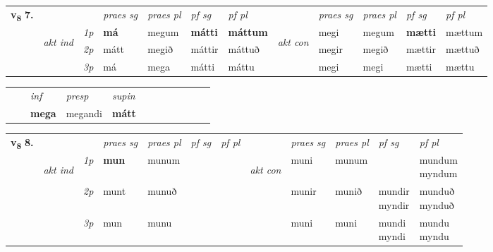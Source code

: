 \begin{tabular}{llllllllllll} \toprule
\multirow{4}{*}{{{\textbf{v{\textsubscript{8}}} \Large{\textbf{7.}}}}}  & &   &  \textit{praes sg}  & \textit{praes pl}  &\textit{ pf sg} & \textit{pf pl} &  &  \textit{praes sg}  & \textit{praes pl}  & \textit{pf sg} & \textit{pf pl } \\*
	\cmidrule{4-7} \cmidrule{9-12}
 & \multirow{3}{*}{\begin{turn}{90}\textit{akt ind}\end{turn}} & {\textit{1p}} & \textbf{má} & megum    & \textbf{mátti} & \textbf{máttum} & \multirow{3}{*}{\begin{turn}{90}\textit{akt con}\end{turn}} &megi & megum & \textbf{mætti} & mættum\\*
& &  {\textit{2p}} &  mátt  & megið   & máttir & máttuð & & megir & megið & mættir & mættuð \\*
& &  {\textit{3p}} & má & mega   & mátti & máttu & & megi & megi& mætti & mættu  \\*
\cmidrule{4-7} \cmidrule{9-12}
\end{tabular}


\begin{tabular}{llllllllllll}
 & & \textit{inf}     & \textit{presp} & \textit{supin}       \\*
  & & \textbf{mega}      & megandi &  \textbf{mátt}   \\*
\cmidrule{1-12}
\end{tabular}



\begin{tabular}{llllllllllll} \toprule
\multirow{4}{*}{{{\textbf{v{\textsubscript{8}}} \Large{\textbf{8.}}}}}  & &   &  \textit{praes sg}  & \textit{praes pl}  &\textit{ pf sg} & \textit{pf pl} &  &  \textit{praes sg}  & \textit{praes pl}  & \textit{pf sg} & \textit{pf pl } \\*
	\cmidrule{4-7} \cmidrule{9-12}
 & \multirow{3}{*}{\begin{turn}{90}\textit{akt ind}\end{turn}} & {\textit{1p}} & \textbf{mun} & munum    & \textbf{} & \textbf{} & \multirow{3}{*}{\begin{turn}{90}\textit{akt con}\end{turn}} &muni & munum & \textbf{\specialcell{mundi\\ myndi}} & \specialcell{mundum\\ myndum}\\*
& &  {\textit{2p}} &  munt  & munuð   &  &  & & munir & munið & \specialcell{mundir\\ myndir} & \specialcell{munduð\\ mynduð} \\*
& &  {\textit{3p}} & mun & munu   &  &  & & muni & muni& \specialcell{mundi\\ myndi} & \specialcell{mundu\\ myndu}  \\*
\cmidrule{4-7} \cmidrule{9-12}
\end{tabular}


